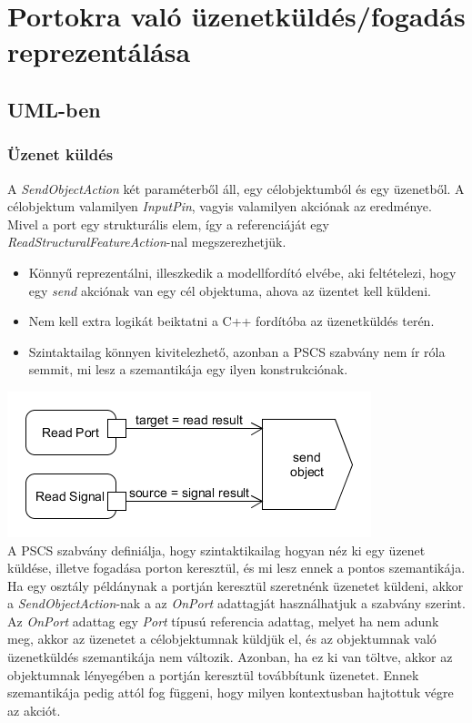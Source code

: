 \documentclass[a4paper,12pt]{report}
\begin{document}
\section{Portokra való üzenetküldés/fogadás reprezentálása} \label{message}
\subsection{UML-ben}

\subsubsection{Üzenet küldés}
A  \textit{SendObjectAction} két paraméterből áll, egy célobjektumból és egy üzenetből.
A célobjektum valamilyen \textit{InputPin}, vagyis valamilyen akciónak az eredménye.
Mivel a port egy strukturális elem, így a referenciáját egy \textit{ReadStructuralFeatureAction}-nal megszerezhetjük. 
\begin{itemize}
\item Könnyű reprezentálni, illeszkedik a modellfordító elvébe, aki feltételezi, hogy
egy \textit{send} akciónak van egy cél objektuma, ahova az üzentet kell küldeni.
\item Nem kell extra logikát beiktatni a C++ fordítóba az üzenetküldés terén.
\item Szintaktailag könnyen kivitelezhető, azonban a PSCS szabvány nem ír róla semmit, mi lesz a szemantikája egy ilyen konstrukciónak.
\end{itemize}

\includegraphics[scale=0.8]{send_uml.png} \\

A PSCS szabvány definiálja, hogy szintaktikailag hogyan néz ki egy üzenet küldése, illetve fogadása porton keresztül, és mi lesz ennek a pontos szemantikája. \\
Ha egy osztály példánynak a portján keresztül szeretnénk üzenetet küldeni, akkor a \textit{SendObjectAction}-nak a az \textit{OnPort} adattagját használhatjuk a szabvány szerint.  Az \textit{OnPort} adattag egy \textit{Port} típusú referencia adattag, melyet ha nem adunk meg, akkor az üzenetet a célobjektumnak küldjük el, és az objektumnak való üzenetküldés szemantikája nem változik.  Azonban, ha ez ki van töltve, akkor az objektumnak lényegében a portján keresztül továbbítunk üzenetet. Ennek szemantikája pedig attól fog függeni, hogy milyen kontextusban hajtottuk végre az akciót. \\
\end{document}

